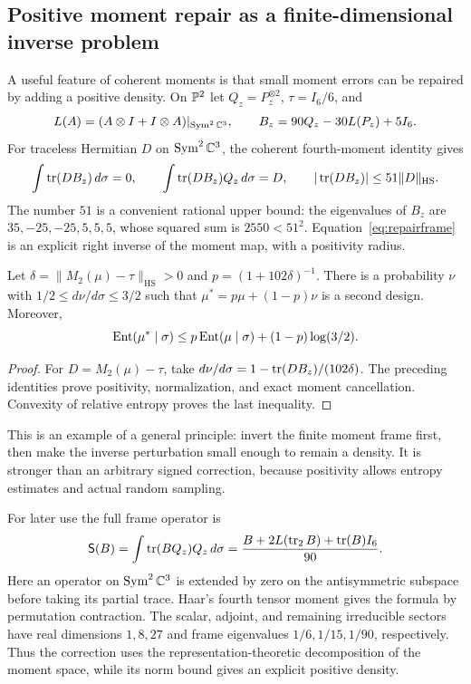 \subsection{Positive moment repair as a finite-dimensional inverse problem}

A useful feature of coherent moments is that small moment errors can be
repaired by adding a positive density. On $\mathbb P^2$ let $Q_z=P_z^{\otimes2}$,
$\tau=I_6/6$, and
\[
L(A)=(A\otimes I+I\otimes A)|_{\operatorname{Sym}^2\mathbb C^3},\qquad
B_z=90Q_z-30L(P_z)+5I_6.
\]
For traceless Hermitian $D$ on $\operatorname{Sym}^2\mathbb C^3$, the coherent fourth-moment
identity gives
\begin{equation}\label{eq:repairframe}
\int\operatorname{tr}(DB_z)\,d\sigma=0,\qquad
\int\operatorname{tr}(DB_z)Q_z\,d\sigma=D,\qquad
|\operatorname{tr}(DB_z)|\le51\|D\|_{\mathrm{HS}}.
\end{equation}
The number $51$ is a convenient rational upper bound: the eigenvalues of
$B_z$ are $35,-25,-25,5,5,5$, whose squared sum is $2550<51^2$.
Equation~\eqref{eq:repairframe} is an explicit right inverse of the moment
map, with a positivity radius.

\begin{proposition}\label{prop:repair}
Let $\delta=\|M_2(\mu)-\tau\|_{\mathrm{HS}}>0$ and
$p=(1+102\delta)^{-1}$. There is a probability $\nu$ with
$1/2\le d\nu/d\sigma\le3/2$ such that
$\mu^*=p\mu+(1-p)\nu$ is a second design. Moreover,
\[
\operatorname{Ent}(\mu^*\mid\sigma)
\le p\operatorname{Ent}(\mu\mid\sigma)+(1-p)\log(3/2).
\]
\end{proposition}
\begin{proof}
For $D=M_2(\mu)-\tau$, take
$d\nu/d\sigma=1-\operatorname{tr}(DB_z)/(102\delta)$.
The preceding identities prove positivity, normalization, and exact moment
cancellation. Convexity of relative entropy proves the last inequality.
\end{proof}

This is an example of a general principle: invert the finite moment frame
first, then make the inverse perturbation small enough to remain a density.
It is stronger than an arbitrary signed correction, because positivity
allows entropy estimates and actual random sampling.

For later use the full frame operator is
\begin{equation}
 \mathsf S(B)=\int\operatorname{tr}(BQ_z)Q_z\,d\sigma
 =\frac{B+2L(\operatorname{tr}_2B)+\operatorname{tr}(B)I_6}{90}.
 \label{an:frame-spectrum}
\end{equation}
Here an operator on $\operatorname{Sym}^2\mathbb C^3$ is extended by zero on the antisymmetric
subspace before taking its partial trace. Haar's fourth tensor moment
gives the formula by permutation contraction. The scalar, adjoint, and
remaining irreducible sectors have real dimensions $1,8,27$ and frame
eigenvalues $1/6,1/15,1/90$, respectively. Thus the correction uses the
representation-theoretic decomposition of the moment space, while its
norm bound gives an explicit positive density.

